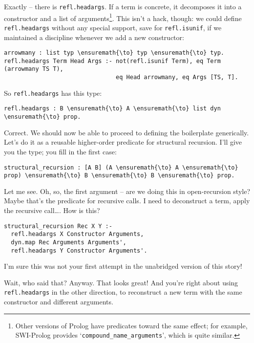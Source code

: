 \heroADVISOR{} Exactly -- there is \texttt{refl.headargs}. If a term is
concrete, it decomposes it into a constructor and a list of
arguments\footnote{Other versions of Prolog have predicates toward the same effect; for example, SWI-Prolog \citep{wielemaker2012swi} provides `\texttt{compound\_{}name\_{}arguments}', which is quite similar.}.
This isn't a hack, though: we could define \texttt{refl.headargs}
without any special support, save for \texttt{refl.isunif}, if we
maintained a discipline whenever we add a new constructor:

\begin{verbatim}
arrowmany : list typ \ensuremath{\to} typ \ensuremath{\to} typ.
refl.headargs Term Head Args :- not(refl.isunif Term), eq Term (arrowmany TS T),
                                eq Head arrowmany, eq Args [TS, T].
\end{verbatim}

\heroSTUDENT{} So \texttt{refl.headargs} has this type:

\begin{verbatim}
refl.headargs : B \ensuremath{\to} A \ensuremath{\to} list dyn \ensuremath{\to} prop.
\end{verbatim}

\heroADVISOR{} Correct. We should now be able to proceed to defining the
boilerplate generically. Let's do it as a reusable higher-order
predicate for structural recursion. I'll give you the type; you fill in
the first case:

\begin{verbatim}
structural_recursion : [A B] (A \ensuremath{\to} A \ensuremath{\to} prop) \ensuremath{\to} B \ensuremath{\to} B \ensuremath{\to} prop.
\end{verbatim}

\heroSTUDENT{} Let me see. Oh, so, the first argument -- are we doing this in
open-recursion style? Maybe that's the predicate for recursive calls. I
need to deconstruct a term, apply the recursive call\ldots{}. How is
this?

\begin{verbatim}
structural_recursion Rec X Y :-
  refl.headargs X Constructor Arguments,
  dyn.map Rec Arguments Arguments',
  refl.headargs Y Constructor Arguments'.
\end{verbatim}

\heroAUDIENCE{} I'm sure this was not your first attempt in the unabridged
version of this story!

\heroADVISOR{} Wait, who said that? Anyway. That looks great! And you're right
about using \texttt{refl.headargs} in the other direction, to
reconstruct a new term with the same constructor and different
arguments.

